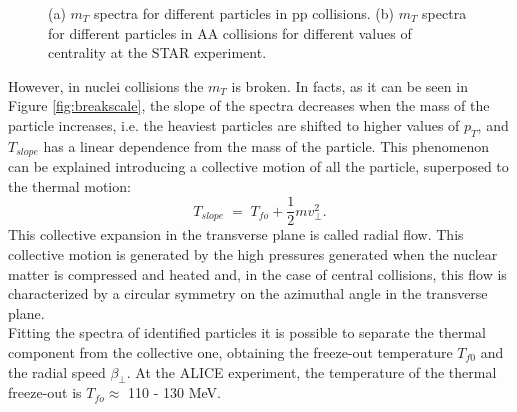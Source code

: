 \begin{figure}
  \centering
  \quad
  \caption{(a) $m_{T}$ spectra for different particles in pp collisions. (b) $m_{T}$ spectra for different particles in AA collisions for different values of centrality at the STAR experiment.}
\end{figure}
%
However, in nuclei collisions the $m_{T}$ is broken. In facts, as it can be seen in Figure \ref{fig:breakscale}, the slope of the spectra decreases when the mass of the particle increases, i.e. the heaviest particles are shifted to higher values of $p_{T}$, and $T_{slope}$ has a linear dependence from the mass of the particle. This phenomenon can be explained introducing a collective motion of all the particle, superposed to the thermal motion:
\begin{equation}
 T_{slope}\;=\;T_{fo} + \frac{1}{2}mv_{\perp}^{2}.
\end{equation}
This collective expansion in the transverse plane is called radial flow. This collective motion is generated by the high pressures generated when the nuclear matter is compressed and heated and, in the case of central collisions, this flow is characterized by a circular symmetry on the azimuthal angle in the transverse plane.\\
Fitting the spectra of identified particles it is possible to separate the thermal component from the collective one, obtaining the freeze-out temperature $T_{f0}$ and the radial speed $\beta_{\perp}$. At the ALICE experiment, the temperature of the thermal freeze-out is $T_{fo} \approx$ 110 - 130 MeV.\\
